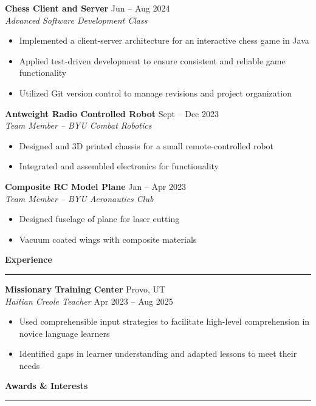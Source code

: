 \documentclass[a4paper,10pt]{article}
\newcommand{\sectionline}{\noindent\rule{\linewidth}{1pt}\vspace{-0.5em}}  %
\begin{document}
\textbf{Chess Client and Server} \hfill Jun -- Aug 2024 \\
\emph{Advanced Software Development Class}
\begin{itemize}[noitemsep, topsep=0pt]
    \item Implemented a client-server architecture for an interactive chess game in Java
    \item Applied test-driven development to ensure consistent and reliable game functionality
    \item Utilized Git version control to manage revisions and project organization 
\end{itemize}

\textbf{Antweight Radio Controlled Robot} \hfill Sept -- Dec 2023 \\
\emph{Team Member -- BYU Combat Robotics}
\begin{itemize}[noitemsep, topsep=0pt]
    \item Designed and 3D printed chassis for a small remote-controlled robot
    \item Integrated and assembled electronics for functionality
\end{itemize}

\textbf{Composite RC Model Plane} \hfill Jan -- Apr 2023 \\
\emph{Team Member -- BYU Aeronautics Club}
\begin{itemize}[noitemsep, topsep=0pt]
    \item Designed fuselage of plane for laser cutting
    \item Vacuum coated wings with composite materials
\end{itemize}  

\textbf{\large Experience} \vspace{-1em}\\
\sectionline

\textbf{Missionary Training Center} \hfill Provo, UT \\
\emph{Haitian Creole Teacher} \hfill Apr 2023 -- Aug 2025
\begin{itemize}[noitemsep, topsep=0pt]
    \item Used comprehensible input strategies to facilitate high-level comprehension in novice language learners
    \item Identified gaps in learner understanding and adapted lessons to meet their needs
\end{itemize}

\textbf{\large Awards \& Interests} \vspace{-1em}\\
\sectionline
\end{document}
